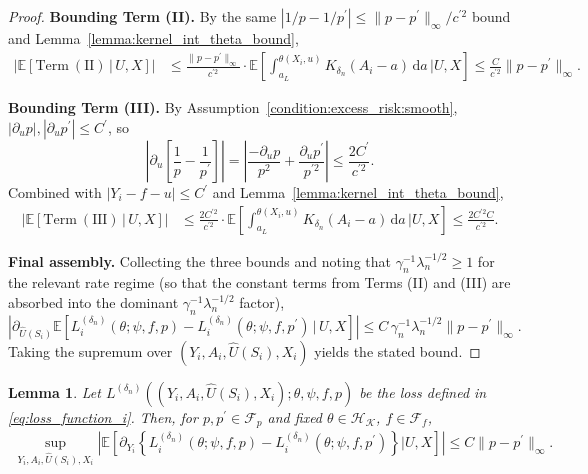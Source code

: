 \documentclass[12pt]{article}
\newtheorem{lemma}{Lemma}%
\newcommand{\E}{\mathbb{E}}
\begin{document}
\begin{proof}
\noindent\textbf{Bounding Term (II).}
By the same $|1/p-1/p^\prime|\leq\|p-p^\prime\|_\infty/c^{\prime 2}$ bound and Lemma~\ref{lemma:kernel_int_theta_bound},
\begin{align*}
\left|\E\!\left[\mathrm{Term\ (II)}\,\big|\,U,X\right]\right|
&\leq \frac{\|p-p^\prime\|_\infty}{c^{\prime 2}}\cdot\E\!\left[\int_{a_L}^{\theta(X_i,u)}K_{\delta_n}(A_i-a)\,\mathrm{d}a\,\Bigg|U,X\right]
\leq \frac{C}{c^{\prime 2}}\|p-p^\prime\|_\infty.
\end{align*}

\noindent\textbf{Bounding Term (III).}
By Assumption~\ref{condition:excess_risk:smooth}, $|\partial_u p|,|\partial_u p^\prime|\leq C^\prime$, so
$$\left|\partial_u\!\left[\frac{1}{p}-\frac{1}{p^\prime}\right]\right| = \left|\frac{-\partial_u p}{p^2}+\frac{\partial_u p^\prime}{p^{\prime 2}}\right|\leq \frac{2C^\prime}{c^{\prime 2}}.$$
Combined with $|Y_i-f-u|\leq C^\prime$ and Lemma~\ref{lemma:kernel_int_theta_bound},
\begin{align*}
\left|\E\!\left[\mathrm{Term\ (III)}\,\big|\,U,X\right]\right|
&\leq \frac{2C^{\prime 2}}{c^{\prime 2}}\cdot\E\!\left[\int_{a_L}^{\theta(X_i,u)}K_{\delta_n}(A_i-a)\,\mathrm{d}a\,\Bigg|U,X\right]
\leq \frac{2C^{\prime 2}C}{c^{\prime 2}}.
\end{align*}

\noindent\textbf{Final assembly.}
Collecting the three bounds and noting that $\gamma_n^{-1}\lambda_n^{-1/2}\geq 1$ for the relevant rate regime (so that the constant terms from Terms (II) and (III) are absorbed into the dominant $\gamma_n^{-1}\lambda_n^{-1/2}$ factor),
$$\left|\partial_{\widehat U(S_i)}\E\!\left[L^{(\delta_n)}_i(\theta;\psi,f,p) - L^{(\delta_n)}_i(\theta;\psi,f,p^\prime)\,\big|\,U,X\right]\right|
\leq C\,\gamma_n^{-1}\lambda_n^{-1/2}\|p-p^\prime\|_\infty.$$
Taking the supremum over $(Y_i,A_i,\widehat{U}(S_i),X_i)$ yields the stated bound.
\end{proof}

\begin{lemma}\label{lemma:L_i_derivative_Y_diff_p}
    Let $L^{(\delta_n)}((Y_i,A_i,\widehat U(S_i),X_i);\theta,\psi,f,p)$ be the loss defined in \eqref{eq:loss_function_i}. Then, for $p,p^\prime\in\mathcal{F}_p$ and fixed $\theta\in\mathcal{H}_\mathcal{K}$, $f\in\mathcal{F}_f$,
    \begin{align*}
        \sup_{Y_i,A_i,\widehat U(S_i),X_i}\left|\E\!\left[\partial_{Y_i}\!\left\{L^{(\delta_n)}_i(\theta;\psi,f,p) - L^{(\delta_n)}_i(\theta;\psi,f,p^\prime)\right\}\Big|U,X\right]\right|
        \leq C\|p-p^\prime\|_\infty.
    \end{align*}
\end{lemma}
\end{document}
